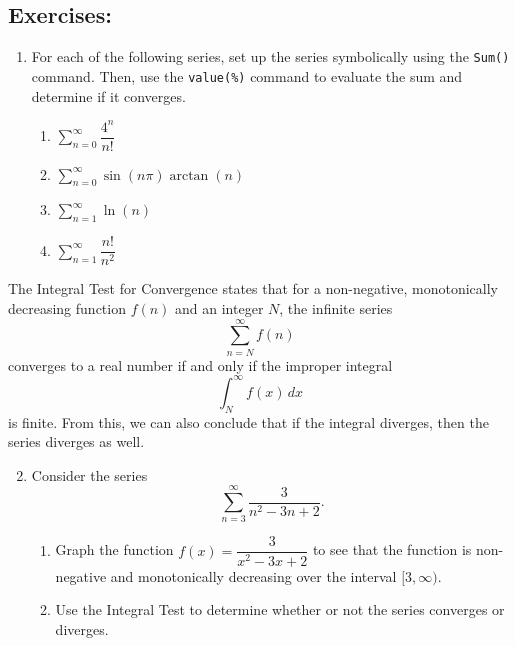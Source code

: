 \subsection*{Exercises:}

\begin{enumerate}
\item For each of the following series, set up the series symbolically using the \texttt{Sum()} command. Then, use the \texttt{value(\%)} command to evaluate the sum and determine if it converges.
\begin{multicols}{2}
\begin{enumerate}
    \item $\displaystyle\sum_{n=0}^{\infty} \dfrac{4^n}{n!}$
    \item $\displaystyle\sum_{n=0}^{\infty} \sin(n\pi)\arctan(n)$
    \item $\displaystyle\sum_{n=1}^{\infty} \ln(n)$
    \item $\displaystyle\sum_{n=1}^{\infty} \dfrac{n!}{n^2}$
\end{enumerate}
\end{multicols}
\end{enumerate}
\clearpage
The Integral Test for Convergence states that for a non-negative, monotonically decreasing function $f(n)$ and an integer $N$, the infinite series $$\sum_{n=N}^{\infty} f(n)$$ converges to a real number if and only if the improper integral $$\int_N^{\infty} f(x)\,dx$$ is finite. From this, we can also conclude that if the integral diverges, then the series diverges as well.\\
\begin{enumerate}
\setcounter{enumi}{1}
\item Consider the series
\[ \sum_{n=3}^{\infty}\dfrac{3}{n^2-3n+2}. \]
\begin{enumerate}
    
    \item Graph the function $f(x) = \dfrac{3}{x^2-3x+2}$ to see that the function is non-negative and monotonically decreasing over the interval $[3,\infty)$.
    \item Use the Integral Test to determine whether or not the series converges or diverges.
\end{enumerate}
\end{enumerate}